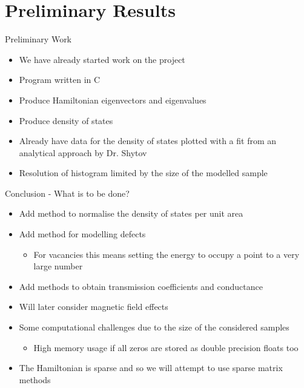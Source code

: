 \documentclass{beamer}
\begin{document}
\section{Preliminary Results}

\begin{frame}[t]{Preliminary Work}
\begin{itemize}
\item We have already started work on the project
\item Program written in C
\item Produce Hamiltonian eigenvectors and eigenvalues
\item Produce density of states
\item Already have data for the density of states plotted with a fit from an analytical approach by Dr. Shytov
\item Resolution of histogram limited by the size of the modelled sample
\end{itemize}
\end{frame}

{
\begin{frame}[plain]
\end{frame}
}

\begin{frame}[t]{Conclusion - What is to be done?}
\begin{itemize}
\item Add method to normalise the density of states per unit area
\item Add method for modelling defects
\begin{itemize}
\item For vacancies this means setting the energy to occupy a point to a very large number
\end{itemize}
\item Add methods to obtain transmission coefficients and conductance
\item Will later consider magnetic field effects
\item Some computational challenges due to the size of the considered samples
\begin{itemize}
\item High memory usage if all zeros are stored as double precision floats too
\end{itemize}
\item The Hamiltonian is sparse and so we will attempt to use sparse matrix methods
\end{itemize}
\end{frame}
\end{document}
